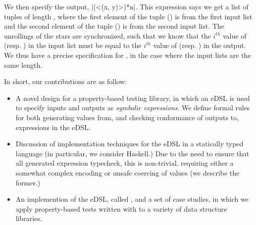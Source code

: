 We then specify the output,
\hskin|(<(x, y)>)*{n}|.
This expression says we get a list of tuples
of length ,
where the first element of the tuple () is
from the first input list
 and the second element of the tuple () is from the second input list.
The unrollings of the stars are synchronized,
such that we know that the $i^{th}$ value of  (resp. ) in the input list
must be equal to the $i^{th}$ value of  (resp. ) in the output.
We thus have a precise specification for ,
in the case where the input lists are the same length.


In short, our contributions are as follow:
\begin{itemize}
\item A novel design for a property-based testing library,
in which an eDSL is used to specify inputs and outputs
as \textit{symbolic expressions}.
We define formal rules for both generating values from,
and checking conformance of outputs to,
expressions in the eDSL.

\item Discussion of implementation techniques
for the eDSL in a statically typed language (in particular, we consider Haskell.)
Due to the need to ensure that all generated expression typecheck,
this is non-trivial, requiring either a somewhat complex encoding or unsafe coercing of values (we describe the former.)

\item An implemention of the eDSL, called \ourDSL,
and a set of case studies,
in which we apply property-based tests
written with \ourDSL to a variety of data structure libraries.
\end{itemize}
